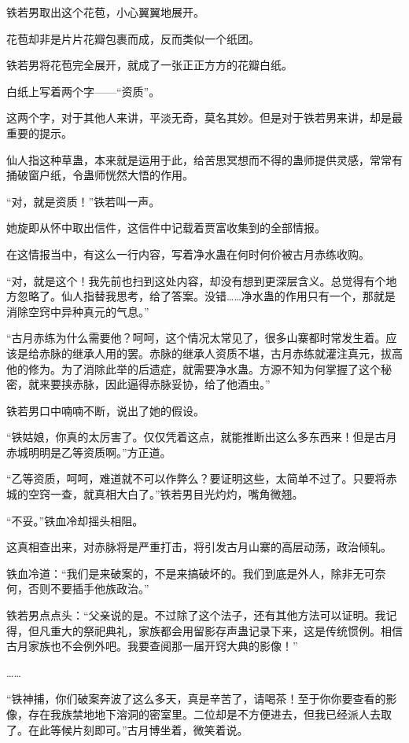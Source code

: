 \begin{this_body}
铁若男取出这个花苞，小心翼翼地展开。

花苞却非是片片花瓣包裹而成，反而类似一个纸团。

铁若男将花苞完全展开，就成了一张正正方方的花瓣白纸。

白纸上写着两个字——“资质”。

这两个字，对于其他人来讲，平淡无奇，莫名其妙。但是对于铁若男来讲，却是最重要的提示。

仙人指这种草蛊，本来就是运用于此，给苦思冥想而不得的蛊师提供灵感，常常有捅破窗户纸，令蛊师恍然大悟的作用。

“对，就是资质！”铁若叫一声。

她旋即从怀中取出信件，这信件中记载着贾富收集到的全部情报。

在这情报当中，有这么一行内容，写着净水蛊在何时何价被古月赤练收购。

“对，就是这个！我先前也扫到这处内容，却没有想到更深层含义。总觉得有个地方忽略了。仙人指替我思考，给了答案。没错……净水蛊的作用只有一个，那就是消除空窍中异种真元的气息。”

“古月赤练为什么需要他？呵呵，这个情况太常见了，很多山寨都时常发生着。应该是给赤脉的继承人用的罢。赤脉的继承人资质不堪，古月赤练就灌注真元，拔高他的修为。为了消除此举的后遗症，就需要净水蛊。方源不知为何掌握了这个秘密，就来要挟赤脉，因此逼得赤脉妥协，给了他酒虫。”

铁若男口中喃喃不断，说出了她的假设。

“铁姑娘，你真的太厉害了。仅仅凭着这点，就能推断出这么多东西来！但是古月赤城明明是乙等资质啊。”方正道。

“乙等资质，呵呵，难道就不可以作弊么？要证明这些，太简单不过了。只要将赤城的空窍一查，就真相大白了。”铁若男目光灼灼，嘴角微翘。

“不妥。”铁血冷却摇头相阻。

这真相查出来，对赤脉将是严重打击，将引发古月山寨的高层动荡，政治倾轧。

铁血冷道：“我们是来破案的，不是来搞破坏的。我们到底是外人，除非无可奈何，否则不要插手他族政治。”

铁若男点点头：“父亲说的是。不过除了这个法子，还有其他方法可以证明。我记得，但凡重大的祭祀典礼，家族都会用留影存声蛊记录下来，这是传统惯例。相信古月家族也不会例外吧。我要查阅那一届开窍大典的影像！”

……

“铁神捕，你们破案奔波了这么多天，真是辛苦了，请喝茶！至于你你要查看的影像，存在我族禁地地下溶洞的密室里。二位却是不方便进去，但我已经派人去取了。在此等候片刻即可。”古月博坐着，微笑着说。


\end{this_body}
